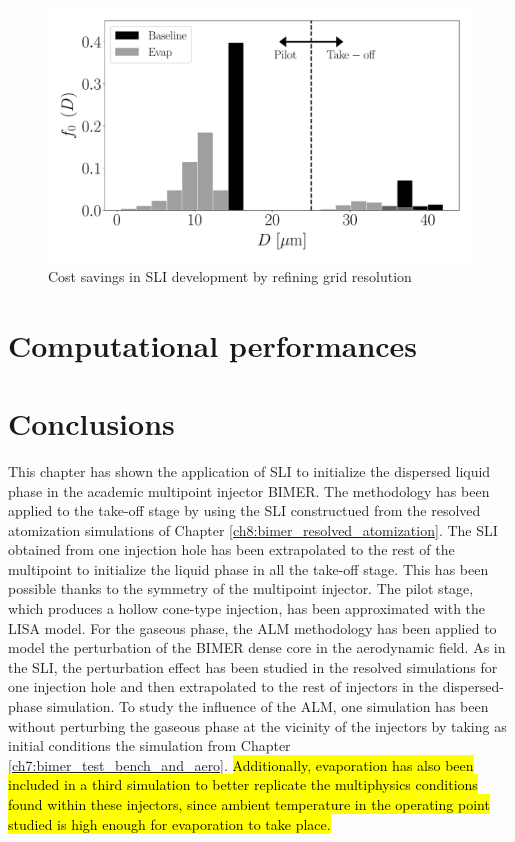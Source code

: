 \begin{figure}[ht]
   \centering
   \includegraphics[scale=0.4]{./part3_applications/figures_ch9_lagrangian/droplets_histograms}
   \caption{Cost savings in SLI development by refining grid resolution}
   \label{fig:LGS_BIMER_droplets_histograms}
\end{figure}


\section{Computational performances}

\section{Conclusions}


This chapter has shown the application of SLI to initialize the dispersed liquid phase in the academic multipoint injector BIMER. The methodology has been applied to the take-off stage by using the SLI constructued from the resolved atomization simulations of Chapter \ref{ch8:bimer_resolved_atomization}. The SLI obtained from one injection hole has been extrapolated to the rest of the multipoint to initialize the liquid phase in all the take-off stage. This has been possible thanks to the symmetry of the multipoint injector. The pilot stage, which produces a hollow cone-type injection, has been approximated with the LISA 
model. For the gaseous phase, the ALM methodology has been applied to model the perturbation of the BIMER dense core in the aerodynamic field. As in the SLI, the perturbation effect has been studied in the resolved simulations for one injection hole and then extrapolated to the rest of injectors in the dispersed-phase simulation. To study the influence of the ALM, one simulation has been without perturbing the gaseous phase at the vicinity of the injectors by taking as initial conditions the simulation from Chapter \ref{ch7:bimer_test_bench_and_aero}. \hl{Additionally, evaporation has also been included in a third simulation to better replicate the multiphysics conditions found within these injectors, since ambient temperature in the operating point studied is high enough for evaporation to take place.}

